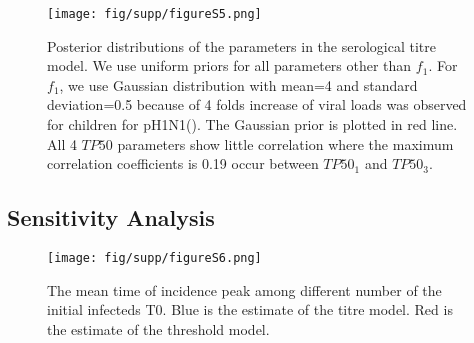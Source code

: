 \documentclass{article}
\begin{document}
\clearpage

\begin{figure}[h!]
      \texttt{[image: fig/supp/figureS5.png]}
      \caption{Posterior distributions of the parameters in the serological titre model. We use uniform priors for all parameters other than $f_{1}$. For $f_{1}$, we use Gaussian distribution with mean=4 and standard deviation=0.5 because of 4 folds increase of viral loads was observed for children for pH1N1(\cite{Lee2011}). The Gaussian prior is plotted in red line. All 4 $TP50$ parameters show little correlation where the maximum correlation coefficients is 0.19 occur between $TP50_{1}$ and $TP50_{3}$.}
\end{figure}

\subsection{Sensitivity Analysis}
\begin{figure}[h!]
      \texttt{[image: fig/supp/figureS6.png]}
      \caption{The mean time of incidence peak among different number of the initial infecteds T0. Blue is the estimate of the titre model. Red is the estimate of the threshold model.}
\end{figure}

\clearpage
\end{document}
